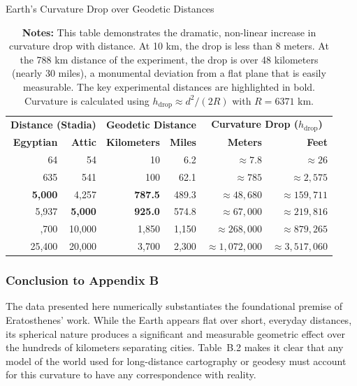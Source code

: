 \documentclass[11pt]{article}
\begin{document}
\newpage

\begin{table}[htbp]
\centering
\caption{Earth's Curvature Drop over Geodetic Distances}
\label{tab:curvature_drop}
\small
\begin{tabular}{@{}rrrrrr@{}}
\toprule
\multicolumn{2}{c}{\textbf{Distance (Stadia)}} & \multicolumn{2}{c}{\textbf{Geodetic Distance}} & \multicolumn{2}{c}{\textbf{Curvature Drop ($h_{\text{drop}}$)}} \\
\cmidrule(r){1-2} \cmidrule(lr){3-4} \cmidrule(l){5-6}
\textbf{Egyptian} & \textbf{Attic} & \textbf{Kilometers} & \textbf{Miles} & \textbf{Meters} & \textbf{Feet} \\
\midrule
64 & 54 & 10 & 6.2 & $\approx 7.8$ & $\approx 26$ \\
635 & 541 & 100 & 62.1 & $\approx 785$ & $\approx 2,575$ \\
\addlinespace
\textbf{5,000} & 4,257 & \textbf{787.5} & 489.3 & $\approx 48,680$ & $\approx 159,711$ \\
5,937 & \textbf{5,000} & \textbf{925.0} & 574.8 & $\approx 67,000$ & $\approx 219,816$ \\
\addlinespace
12,700 & 10,000 & 1,850 & 1,150 & $\approx 268,000$ & $\approx 879,265$ \\
25,400 & 20,000 & 3,700 & 2,300 & $\approx 1,072,000$ & $\approx 3,517,060$ \\
\bottomrule
\end{tabular}
\captionsetup{font=small, justification=justified}
\caption*{
\textbf{Notes:} This table demonstrates the dramatic, non-linear increase in curvature drop with distance. At 10 km, the drop is less than 8 meters. At the 788 km distance of the experiment, the drop is over 48 kilometers (nearly 30 miles), a monumental deviation from a flat plane that is easily measurable. The key experimental distances are highlighted in bold. Curvature is calculated using $h_{\text{drop}} \approx d^2/(2R)$ with $R = 6371$ km.
}
\end{table}

\subsubsection*{Conclusion to Appendix B}

The data presented here numerically substantiates the foundational premise of Eratosthenes' work. While the Earth appears flat over short, everyday distances, its spherical nature produces a significant and measurable geometric effect over the hundreds of kilometers separating cities. Table~B.2 makes it clear that any model of the world used for long-distance cartography or geodesy must account for this curvature to have any correspondence with reality. 
\end{document}

